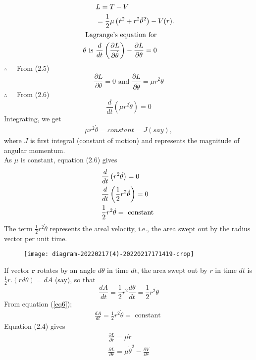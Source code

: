 \begin{align}
&L=T-V \\
&=\frac{1}{2} \mu\left(\dot{r}^{2}+r^{2} \dot{\theta}^{2}\right)-V(r) .\\
\intertext { Lagrange's equation for } \theta \text { is } &\frac{d}{d t}\left(\frac{\partial L}{\partial \dot{\theta}}\right)-\frac{\partial L}{\partial \theta}=0
\end{align}
$\therefore \quad$ From (2.5)
$$
\frac{\partial L}{\partial \theta}=0 \text { and } \frac{\partial L}{\partial \dot{\theta}}=\mu r^{2} \dot{\theta}
$$
$\therefore \quad$ From (2.6)
$$
\frac{d}{d t}\left(\mu r^{2} \dot{\theta}\right)=0
$$
Integrating, we get\\
\begin{align}
\mu r^{2} \dot{\theta}= constant =J (say),
\end{align}
where $J$ is first integral (constant of motion) and represents the magnitude of angular momentum.\\
As $\mu$ is constant, equation (2.6) gives\\
\begin{align}
	&\frac{d}{d t}\left(r^{2} \dot{\theta}\right)=0 \notag\\
	&\frac{d}{d t}\left(\frac{1}{2} r^{2} \dot{\theta}\right)=0 \notag\\
	&\frac{1}{2} r^{2} \dot{\theta}=\text { constant }\label{eq6}
\end{align}
The term $\frac{1}{2} r^{2} \dot{\theta}$ represents the areal velocity, i.e., the area swept out by the radius vector per unit time.
\begin{figure}[H]
	\centering
	\texttt{[image: diagram-20220217(4)-20220217171419-crop]}
	\caption{}
	\label{}
\end{figure}
If vector $\mathbf{r}$ rotates by an angle $d \theta$ in time $d t$, the area swept out by $r$ in time $d t$ is $\frac{1}{2} r .(r d \theta)=d A$ (say), so that
$$
\frac{d A}{d t}=\frac{1}{2} r^{2} \frac{d \theta}{d t}=\frac{1}{2} r^{2} \dot{\theta}
$$
From equation (\ref*{eq6});
\begin{align}
\frac{d A}{d t}=\frac{1}{2} r^{2} \dot{\theta}=\text { constant }
\end{align}
Equation (2.4) gives 
\begin{align*}
\frac{\partial L}{\partial \dot{r}}=\mu \dot{r}\\
\frac{\partial L}{\partial r}=\mu \dot{\theta}^{2}-\frac{\partial V}{\partial r} 
\end{align*}
